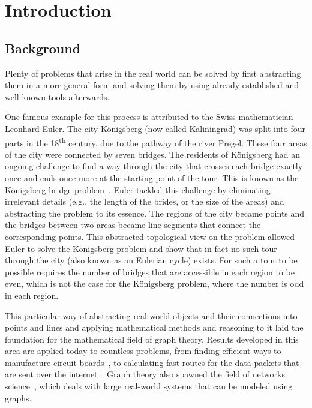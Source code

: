 \chapter{Introduction}
\label{cha:introduction}


\section{Background}
\label{sec:background}

Plenty of problems that arise in the real world can be solved by first abstracting them in a more general form and solving them by using already established and well-known tools afterwards.

One famous example for this process is attributed to the Swiss mathematician Leonhard Euler.
The city Königsberg (now called Kaliningrad) was split into four parts in the 18\textsuperscript{th} century, due to the pathway of the river Pregel.
These four areas of the city were connected by seven bridges.
The residents of Königsberg had an ongoing challenge to find a way through the city that crosses each bridge exactly once and ends once more at the starting point of the tour.
This is known as the Königsberg bridge problem~\cite{Paoletti2011, Cook2012}.
Euler tackled this challenge by eliminating irrelevant details (e.g., the length of the brides, or the size of the areas) and abstracting the problem to its essence.
The regions of the city became points and the bridges between two areas became line segments that connect the corresponding points.
This abstracted topological view on the problem allowed Euler to solve the Königsberg problem and show that in fact no such tour through the city (also known as an Eulerian cycle) exists.
For such a tour to be possible requires the number of bridges that are accessible in each region to be even, which is not the case for the Königsberg problem, where the number is odd in each region.

This particular way of abstracting real world objects and their connections into points and lines and applying mathematical methods and reasoning to it laid the foundation for the mathematical field of graph theory.
Results developed in this area are applied today to countless problems, from finding efficient ways to manufacture circuit boards~\cite{Cook2012}, to calculating fast routes for the data packets that are sent over the internet~\cite{Wang1999}.
Graph theory also spawned the field of networks science~\cite{Newman2010}, which deals with large real-world systems that can be modeled using graphs.

